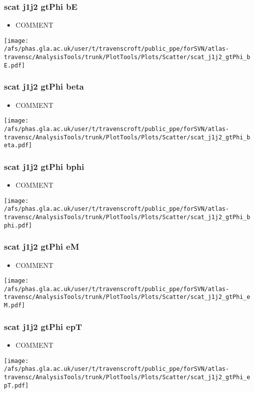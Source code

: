 \documentclass{beamer}
\begin{document}
\begin{frame}
\frametitle{scat j1j2 gtPhi bE}
\begin{itemize}
\item COMMENT
\end{itemize}
\begin{center}
\texttt{[image: /afs/phas.gla.ac.uk/user/t/travenscroft/public\_ppe/forSVN/atlas-travensc/AnalysisTools/trunk/PlotTools/Plots/Scatter/scat\_j1j2\_gtPhi\_bE.pdf]}
\end{center}
\end{frame}

\begin{frame}
\frametitle{scat j1j2 gtPhi beta}
\begin{itemize}
\item COMMENT
\end{itemize}
\begin{center}
\texttt{[image: /afs/phas.gla.ac.uk/user/t/travenscroft/public\_ppe/forSVN/atlas-travensc/AnalysisTools/trunk/PlotTools/Plots/Scatter/scat\_j1j2\_gtPhi\_beta.pdf]}
\end{center}
\end{frame}

\begin{frame}
\frametitle{scat j1j2 gtPhi bphi}
\begin{itemize}
\item COMMENT
\end{itemize}
\begin{center}
\texttt{[image: /afs/phas.gla.ac.uk/user/t/travenscroft/public\_ppe/forSVN/atlas-travensc/AnalysisTools/trunk/PlotTools/Plots/Scatter/scat\_j1j2\_gtPhi\_bphi.pdf]}
\end{center}
\end{frame}

\begin{frame}
\frametitle{scat j1j2 gtPhi eM}
\begin{itemize}
\item COMMENT
\end{itemize}
\begin{center}
\texttt{[image: /afs/phas.gla.ac.uk/user/t/travenscroft/public\_ppe/forSVN/atlas-travensc/AnalysisTools/trunk/PlotTools/Plots/Scatter/scat\_j1j2\_gtPhi\_eM.pdf]}
\end{center}
\end{frame}

\begin{frame}
\frametitle{scat j1j2 gtPhi epT}
\begin{itemize}
\item COMMENT
\end{itemize}
\begin{center}
\texttt{[image: /afs/phas.gla.ac.uk/user/t/travenscroft/public\_ppe/forSVN/atlas-travensc/AnalysisTools/trunk/PlotTools/Plots/Scatter/scat\_j1j2\_gtPhi\_epT.pdf]}
\end{center}
\end{frame}
\end{document}
